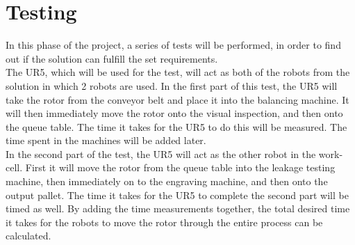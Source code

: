 
\section{Testing}

In this phase of the project, a series of tests will be performed, in order to find out if the solution can fulfill the set requirements.\\ 

The UR5, which will be used for the test, will act as both of the robots from the solution in which 2 robots are used. In the first part of this test, the UR5 will take the rotor from the conveyor belt and place it into the balancing machine. It will then immediately move the rotor onto the visual inspection, and then onto the queue table. The time it takes for the UR5 to do this will be measured. The time spent in the machines will be added later. \\ 

In the second part of the test, the UR5 will act as the other robot in the work-cell. First it will move the rotor from the queue table into the leakage testing machine, then immediately on to the engraving machine, and then onto the output pallet. The time it takes for the UR5 to complete the second part will be timed as well. By adding the time measurements together, the total desired time it takes for the robots to move the rotor through the entire process can be calculated. \\ 
